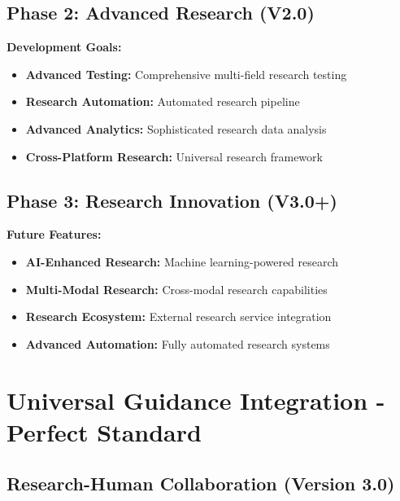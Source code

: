 \documentclass[12pt,a4paper]{article}
\begin{document}
\subsection{Phase 2: Advanced Research (V2.0)}

\textbf{Development Goals:}
\begin{itemize}
    \item \textbf{Advanced Testing:} Comprehensive multi-field research testing
    \item \textbf{Research Automation:} Automated research pipeline
    \item \textbf{Advanced Analytics:} Sophisticated research data analysis
    \item \textbf{Cross-Platform Research:} Universal research framework
\end{itemize}

\subsection{Phase 3: Research Innovation (V3.0+)}

\textbf{Future Features:}
\begin{itemize}
    \item \textbf{AI-Enhanced Research:} Machine learning-powered research
    \item \textbf{Multi-Modal Research:} Cross-modal research capabilities
    \item \textbf{Research Ecosystem:} External research service integration
    \item \textbf{Advanced Automation:} Fully automated research systems
\end{itemize}

\section{Universal Guidance Integration - Perfect Standard}

\subsection{Research-Human Collaboration (Version 3.0)}
\end{document}

